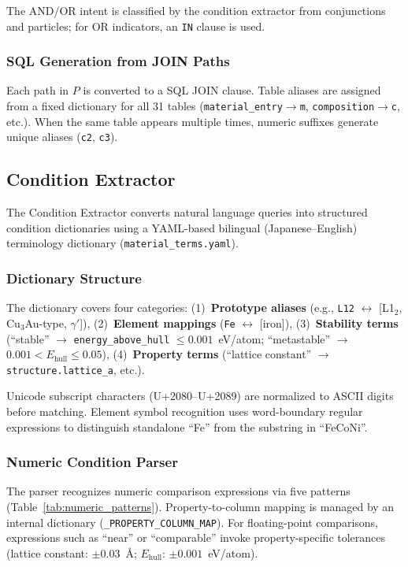 \documentclass{npj-compt.mater}
\begin{document}
The AND/OR intent is classified by the condition extractor from conjunctions and particles;
for OR indicators, an \texttt{IN} clause is used.

\subsubsection{SQL Generation from JOIN Paths}

Each path in $P$ is converted to a SQL JOIN clause.
Table aliases are assigned from a fixed dictionary for all 31 tables
(\texttt{material\_entry}$\to$\texttt{m},
\texttt{composition}$\to$\texttt{c}, etc.).
When the same table appears multiple times,
numeric suffixes generate unique aliases (\texttt{c2}, \texttt{c3}).

\subsection{Condition Extractor}
\label{sec:entity_extractor}

The Condition Extractor converts natural language queries into
structured condition dictionaries using a YAML-based bilingual
(Japanese--English) terminology dictionary (\texttt{material\_terms.yaml}).

\subsubsection{Dictionary Structure}

The dictionary covers four categories:
(1)~\textbf{Prototype aliases} (e.g., \texttt{L12} $\leftrightarrow$
[L1$_2$, Cu$_3$Au-type, $\gamma'$]),
(2)~\textbf{Element mappings} (\texttt{Fe} $\leftrightarrow$ [iron]),
(3)~\textbf{Stability terms} (``stable'' $\to$
\texttt{energy\_above\_hull} $\leq 0.001$~eV/atom;
``metastable'' $\to$ $0.001 < E_\text{hull} \leq 0.05$),
(4)~\textbf{Property terms} (``lattice constant'' $\to$
\texttt{structure.lattice\_a}, etc.).

Unicode subscript characters (U+2080--U+2089) are normalized to ASCII
digits before matching.
Element symbol recognition uses word-boundary regular expressions to
distinguish standalone ``Fe'' from the substring in ``FeCoNi''.

\subsubsection{Numeric Condition Parser}

The parser recognizes numeric comparison expressions via five patterns
(Table~\ref{tab:numeric_patterns}).
Property-to-column mapping is managed by an internal dictionary
(\texttt{\_PROPERTY\_COLUMN\_MAP}).
For floating-point comparisons, expressions such as ``near'' or
``comparable'' invoke property-specific tolerances
(lattice constant: $\pm 0.03$~\AA;
$E_\text{hull}$: $\pm 0.001$~eV/atom).
\end{document}
